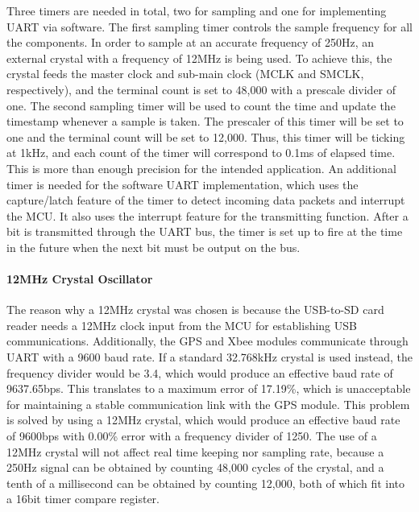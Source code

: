 Three timers are needed in total, two for sampling and one for implementing UART via software. The first sampling timer controls the sample frequency for all the components.  In order to sample at an accurate frequency of 250Hz, an external crystal with a frequency of 12MHz is being used. To achieve this, the crystal feeds the master clock and sub-main clock (MCLK and SMCLK, respectively), and the terminal count is set to 48,000 with a prescale divider of one. The second sampling timer will be used to count the time and update the timestamp whenever a sample is taken. The prescaler of this timer will be set to one and the terminal count will be set to 12,000. Thus, this timer will be ticking at 1kHz, and each count of the timer will correspond to 0.1ms of elapsed time. This is more than enough precision for the intended application. An additional timer is needed for the software UART implementation, which uses the capture/latch feature of the timer to detect incoming data packets and interrupt the MCU. It also uses the interrupt feature for the transmitting function. After a bit is transmitted through the UART bus, the timer is set up to fire at the time in the future when the next bit must be output on the bus.

\paragraph{12MHz Crystal Oscillator}
The reason why a 12MHz crystal was chosen is because the USB-to-SD card reader needs a 12MHz clock input from the MCU for establishing USB communications. Additionally, the GPS and Xbee modules communicate through UART with a 9600 baud rate. If a standard 32.768kHz crystal is used instead, the frequency divider would be 3.4, which would produce an effective baud rate of 9637.65bps. This translates to a maximum error of 17.19\%, which is unacceptable for maintaining a stable communication link with the GPS module. This problem is solved by using a 12MHz crystal, which would produce an effective baud rate of 9600bps with 0.00\% error with a frequency divider of 1250. The use of a 12MHz crystal will not affect real time keeping nor sampling rate, because a 250Hz signal can be obtained by counting 48,000 cycles of the crystal, and a tenth of a millisecond can be obtained by counting 12,000, both of which fit into a 16bit timer compare register. 

